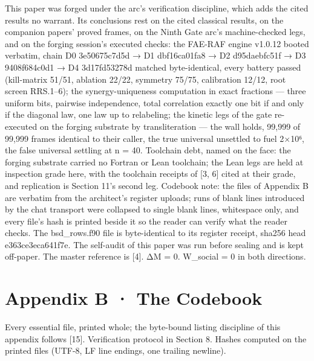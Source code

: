 \documentclass[10pt,twocolumn]{article}
\begin{document}
This paper was forged under the arc's verification discipline, which
adds the cited results no warrant. Its conclusions rest on the cited
classical results, on the companion papers' proved frames, on the Ninth
Gate arc's machine-checked legs, and on the forging session's executed
checks: the FAE-RAF engine v1.0.12 booted verbatim, chain D0
3e50675c7d5d → D1 dbf16ca01fa8 → D2 d95daebfc51f → D3 9408f684c0d1 → D4
3d17fd53278d matched byte-identical, every battery passed (kill-matrix
51/51, ablation 22/22, symmetry 75/75, calibration 12/12, root screen
RRS.1--6); the synergy-uniqueness computation in exact fractions ---
three uniform bits, pairwise independence, total correlation exactly one
bit if and only if the diagonal law, one law up to relabeling; the
kinetic legs of the gate re-executed on the forging substrate by
transliteration --- the wall holds, 99,999 of 99,999 frames identical to
their caller, the true universal unsettled to fuel 2×10⁶, the false
universal settling at n = 40. Toolchain debt, named on the face: the
forging substrate carried no Fortran or Lean toolchain; the Lean legs
are held at inspection grade here, with the toolchain receipts of {[}3,
6{]} cited at their grade, and replication is Section 11's second leg.
Codebook note: the files of Appendix B are verbatim from the architect's
register uploads; runs of blank lines introduced by the chat transport
were collapsed to single blank lines, whitespace only, and every file's
hash is printed beside it so the reader can verify what the reader
checks. The bsd\_rows.f90 file is byte-identical to its register
receipt, sha256 head e363ce3eca641f7e. The self-audit of this paper was
run before sealing and is kept off-paper. The master reference is
{[}4{]}. ΔM = 0. W\_social = 0 in both directions.

\section{Appendix B · The Codebook}\label{appendix-b-the-codebook}

Every essential file, printed whole; the byte-bound listing discipline
of this appendix follows {[}15{]}. Verification protocol in Section 8.
Hashes computed on the printed files (UTF-8, LF line endings, one
trailing newline).
\end{document}
